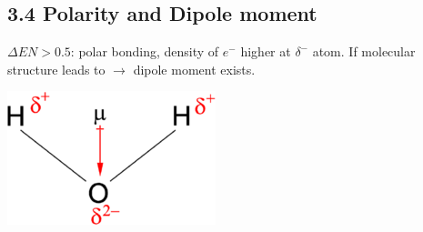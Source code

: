 \subsection{3.4 Polarity and Dipole moment} 
    $\Delta EN>0.5$: polar bonding, density of $e^-$ higher at $\delta^-$ atom.
        If molecular structure leads to  $\rightarrow$ dipole moment exists.
        \begin{center}
            \includegraphics[width=0.3\linewidth]{src/3_Chemical_bondings/images/dipole_moment.png}
        \end{center}